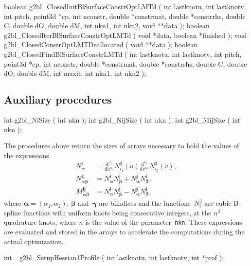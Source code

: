\medskip
\begin{listingC}
boolean g2bl_ClosedInitBlSurfaceConstrOptLMTd (
                 int lastknotu, int lastknotv, int pitch, point3d *cp,
                 int nconstr, double *constrmat, double *constrrhs,   
                 double C, double dO, double dM, int nkn1, int nkn2,  
                 void **data );
boolean g2bl_ClosedIterBlSurfaceConstrOptLMTd ( void *data,
                 boolean *finished );
void g2bl_ClosedConstrOptLMTDeallocated ( void **data );
boolean g2bl_ClosedFindBlSurfaceConstrLMTd (
                 int lastknotu, int lastknotv, int pitch, point3d *cp,
                 int nconstr, double *constrmat, double *constrrhs,   
                 double C, double dO, double dM,
                 int maxit, int nkn1, int nkn2 );
\end{listingC}


\subsection{Auxiliary procedures}

\begin{listingC}
int g2bl_NiSize ( int nkn );
int g2bl_NijSize ( int nkn );
int g2bl_MijSize ( int nkn );
\end{listingC}
The procedures above return the sizes of arrays necessary to hold the values
of the expressions
\begin{align*}
  N_{\bm{\alpha}}^{\bm{i}} &{}=
   \frac{\mathrm{d}^{\alpha_1}}{\mathrm{d}u^{\alpha_1}}N^3_{i_1}(u)
   \frac{\mathrm{d}^{\alpha_2}}{\mathrm{d}v^{\alpha_2}}N^3_{i_2}(v),\\
  N_{\bm{\alpha\beta}}^{\bm{ij}} &{}=
    N^{\bm{i}}_{\bm{\alpha}}N^{\bm{j}}_{\bm{\beta}} +
    N^{\bm{j}}_{\bm{\alpha}}N^{\bm{i}}_{\bm{\beta}},\\
  M_{\bm{\alpha\beta}}^{\bm{ij}} &{}= 
    N^{\bm{i}}_{\bm{\alpha}}N^{\bm{j}}_{\bm{\beta}} -
    N^{\bm{j}}_{\bm{\alpha}}N^{\bm{i}}_{\bm{\beta}},
\end{align*}
where $\bm{\alpha}=(\alpha_1,\alpha_2)$, $\bm{\beta}$ and~$\bm{\gamma}$ are
biindices and the functions~$N^3_i$ are cubic B-spline functions with
uniform knots being consecutive integers, at the $n^2$ quadrature knots,
where $n$ is the value of the parameter~\texttt{nkn}. These expressions
are evaluated and stored in the arrays to accelerate the computations
during the actual optimization.

\medskip
\begin{listingC}
int _g2bl_SetupHessian1Profile ( int lastknotu, int lastknotv,
                                 int *prof );
\end{listingC}

